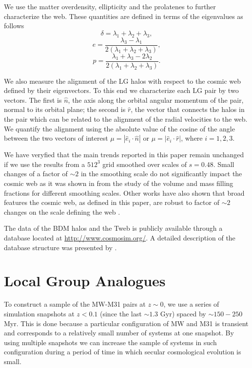 \documentclass{emulateapj}
\newcommand{\hMpc}{{\ifmmode{h^{-1}{\rm Mpc}}\else{$h^{-1}$Mpc }\fi}}
\begin{document}
We use the matter overdensity, ellipticity and the prolatenes to
further characterize the web. 
These quantities are defined in terms of the
eigenvalues as follows 
%
\begin{equation}
\delta = \lambda_1 + \lambda_2 + \lambda_3,
\end{equation}
%
\begin{equation}
e= \frac{\lambda_3 - \lambda_1}{2(\lambda_1 + \lambda_2 + \lambda_3)}, 
\end{equation}
%
\begin{equation}
p= \frac{\lambda_1 + \lambda_3 - 2\lambda_2}{2(\lambda_1 + \lambda_2 +
  \lambda_3)}.
\end{equation}

We also measure the alignment of the LG halos with respect to the
cosmic web defined by their eigenvectors.
To this end we characterize each LG pair by two vectors. 
The first is $\hat{n}$, the axis along the orbital angular
momentum of the pair, normal to its orbital plane; the second is
$\hat{r}$, the vector that connects the halos in the pair which can be
related to the alignment of the radial velocities to the web.
We quantify the alignment using the absolute value of the cosine of
the angle between the two vectors of interest $\mu=|\hat{e}_i \cdot
\hat{n}|$ or $\mu=|\hat{e}_i\cdot \hat{r}|$, where $i=1,2,3$. 



We have
veryfied that the main trends reported in this paper remain unchanged
if we use the results from a $512^3$ grid smoothed over scales of
$s=0.48$\hMpc. Small changes of a factor of $\sim2$ in the smoothing
scale do not significantly impact the cosmic web as it 
was shown in \cite{Tweb} from the study of the volume and mass
filling fractions for different smoothing scales. Other works have
also shown that broad features the cosmic web, as defined in this
paper, are robust to factor of $\sim2$ changes on the scale defining the web
\citep{Cautun2014}.    

The data of the BDM halos and the Tweb is publicly available through
a database located at \url{http://www.cosmosim.org/}. A detailed
description of the database structure was presented by \cite{Riebe2013}.

\section{Local Group Analogues}
\label{sec:lg_analogues}

To construct a sample of the MW-M31 pairs at $z\sim 0$, we use a
series of simulation snapshots  at $z<0.1$ (since the last $\sim
1.3$ Gyr) spaced by $\sim 150-250$ Myr. 
This is done because a particular configuration of MW and M31 is transient and
corresponds to a relatively small number of systems at one
snapshot. 
By using multiple snapshots we can increase the sample of systems in
such configuration during a period of time in which secular
cosmological evolution is small.  
\end{document}
